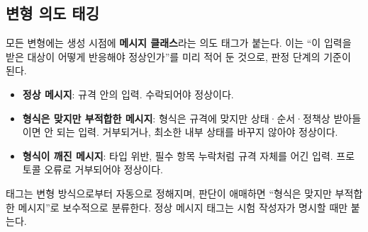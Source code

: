 \subsection{변형 의도 태깅}\label{subsec:tagging}

모든 변형에는 생성 시점에 \textbf{메시지 클래스}라는 의도 태그가 붙는다.
이는 ``이 입력을 받은 대상이 어떻게 반응해야 정상인가''를 미리 적어 둔 것으로, 판정 단계의 기준이 된다.

\begin{itemize}
    \item \textbf{정상 메시지}: 규격 안의 입력. 수락되어야 정상이다.
    \item \textbf{형식은 맞지만 부적합한 메시지}: 형식은 규격에 맞지만 상태·순서·정책상 받아들이면 안 되는 입력. 거부되거나, 최소한 내부 상태를 바꾸지 않아야 정상이다.
    \item \textbf{형식이 깨진 메시지}: 타입 위반, 필수 항목 누락처럼 규격 자체를 어긴 입력. 프로토콜 오류로 거부되어야 정상이다.
\end{itemize}

태그는 변형 방식으로부터 자동으로 정해지며, 판단이 애매하면 ``형식은 맞지만 부적합한 메시지''로 보수적으로 분류한다.
정상 메시지 태그는 시험 작성자가 명시할 때만 붙는다.
